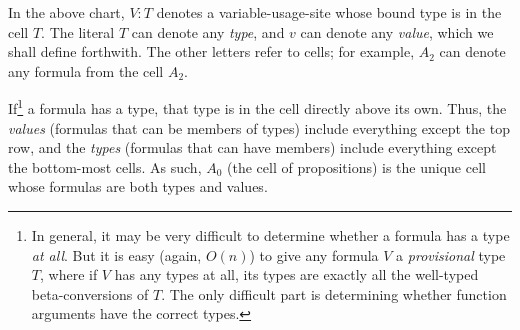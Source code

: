 \documentclass{article}
\begin{document}
  \vspace{0.5cm}

  \noindent{}

  \vspace{0.5cm}

  In the above chart, $V:T$ denotes a variable-usage-site whose bound type is in the cell $T$. The literal $T$ can denote any \emph{type}, and $v$ can denote any \emph{value}, which we shall define forthwith. The other letters refer to cells; for example, $A_2$ can denote any formula from the cell $A_2$.

  If\footnote{In general, it may be very difficult to determine whether a formula has a type \emph{at all}. But it is easy (again, $O(n)$) to give any formula $V$ a \emph{provisional} type $T$, where if $V$ has any types at all, its types are exactly all the well-typed beta-conversions of $T$. The only difficult part is determining whether function arguments have the correct types.} a formula has a type, that type is in the cell directly above its own. Thus, the \emph{values} (formulas that can be members of types) include everything except the top row, and the \emph{types} (formulas that can have members) include everything except the bottom-most cells. As such, $A_0$ (the cell of propositions) is the unique cell whose formulas are both types and values.
\end{document}
